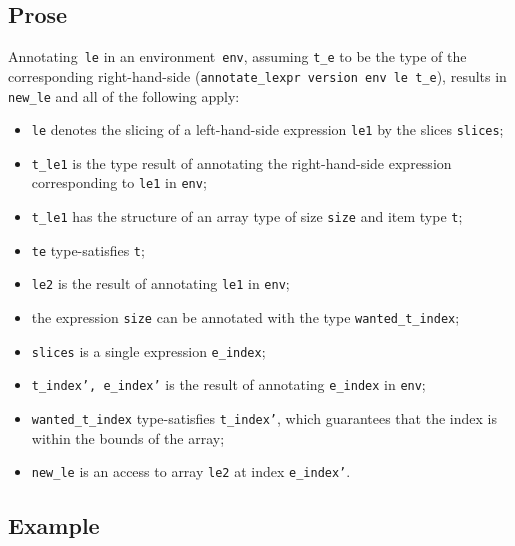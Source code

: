 \documentclass{book}
\begin{document}
\begin{itemize}
  \subsection{Prose}
   Annotating~\texttt{le} in an environment~\texttt{env}, assuming
\texttt{t\_e} to be the type of the corresponding right-hand-side
(\texttt{annotate\_lexpr version env le t\_e}), results in \texttt{new\_le} and
all of the following apply:
   \begin{itemize}
   \item \texttt{le} denotes the slicing of a left-hand-side expression \texttt{le1} by the slices \texttt{slices};
   \item \texttt{t\_le1} is the type result of annotating the right-hand-side expression corresponding to \texttt{le1} in \texttt{env};
   \item \texttt{t\_le1} has the structure of an array type of size \texttt{size} and item type \texttt{t};
   \item \texttt{te} type-satisfies \texttt{t};
   \item \texttt{le2} is the result of annotating \texttt{le1} in \texttt{env};
  \item the expression \texttt{size} can be annotated with the type \texttt{wanted\_t\_index};
  \item \texttt{slices} is a single expression \texttt{e\_index};
   \item \texttt{t\_index', e\_index'} is the result of annotating \texttt{e\_index} in \texttt{env};
   \item \texttt{wanted\_t\_index} type-satisfies \texttt{t\_index'}, which guarantees that the index
   is within the bounds of the array;
   \item \texttt{new\_le} is an access to array \texttt{le2} at index \texttt{e\_index'}.
   \end{itemize}

  \subsection{Example}



\end{itemize}
\end{document}
